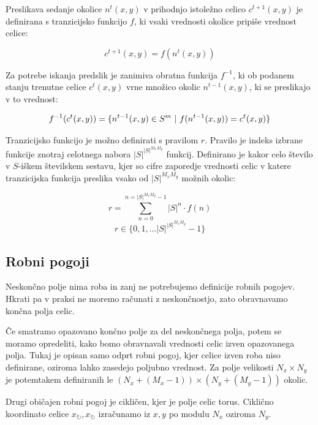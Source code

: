 \documentclass[12pt,a4paper,openany,twoside]{book}
\begin{document}
Preslikava sedanje okolice \(n^{t}(x,y)\) v prihodnjo istoležno celico \(c^{t+1}(x,y)\) je definirana
s tranzicijsko funkcijo \(f\), ki vsaki vrednosti okolice pripiše vrednost celice:

\begin{equation}
c^{t+1}(x,y) = f(n^{t}(x,y))
\end{equation}

Za potrebe iskanja predslik je zanimiva obratna funkcija \(f^{-1}\), ki ob
podanem stanju trenutne celice \(c^{t}(x,y)\) vrne množico okolic \(n^{t-1}(x,y)\),
ki se preslikajo v to vrednost:

\begin{equation}
f^{-1}(c^{t}(x,y)) = \{ n^{t-1}(x,y) \in S^m \ \arrowvert \ f(n^{t-1}(x,y)) = c^{t}(x,y) \}
\end{equation}

Tranzicijsko funkcijo je možno definirati s pravilom  \(r\).
Pravilo je indeks izbrane funkcije znotraj celotnega nabora \(|S|^{|S|^{M_x M_y}}\) funkcij.
Definirano je kakor celo število v \(S\)-iškem številskem sestavu,
kjer so cifre zaporedje vrednosti celic v katere tranzicijska funkcija
preslika vsako od \(|S|^{M_x M_y}\) možnih okolic:

\begin{equation}
r = \sum_{n=0}^{n=|S|^{M_x M_y}-1} |S|^n \cdot f(n)
\end{equation}
\begin{equation}
r \in \{0, 1, \ldots |S|^{|S|^{M_x M_y}}-1\}
\end{equation}

\subsection{Robni pogoji}

Neskončno polje nima roba in zanj ne potrebujemo definicije robnih pogojev.
Hkrati pa v praksi ne moremo računati z neskončnostjo,
zato obravnavamo končna polja celic.

Če smatramo opazovano končno polje za del neskončnega polja,
potem se moramo opredeliti, kako bomo obravnavali vrednosti celic izven opazovanega polja.
Tukaj je opisan samo odprt robni pogoj, kjer celice izven roba niso definirane,
oziroma lahko zasedejo poljubno vrednost.
Za polje velikosti \(N_x \times N_y\) je potemtakem definiranih le \((N_x+(M_x-1)) \times (N_y+(M_y-1))\) okolic.

Drugi običajen robni pogoj je cikličen, kjer je polje celic torus.
Ciklično koordinato celice \(x_{\circlearrowright},x_{\circlearrowright}\) izračunamo iz \(x,y\) po modulu \(N_x\) oziroma \(N_y\).
\end{document}
